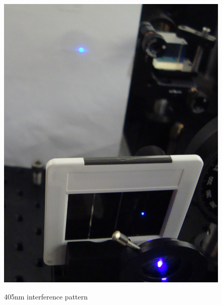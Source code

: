 \documentclass{../lab}
\begin{document}
\begin{figure}[H]
  \href{http://experimentationlab.berkeley.edu/sites/default/files/images/Qe_405interference.jpeg}{\includegraphics[width=\linewidth,keepaspectratio]{images/Qe_405interference.jpeg}}
  \caption{405nm interference pattern}
  \label{fig:Qe_405interference.jpeg}
\endminipage\hfill
{}

\end{figure}
\end{document}
